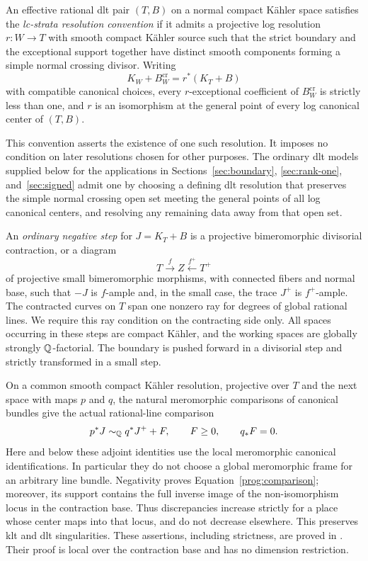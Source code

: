 \begin{definition}
\label{def:lc-strata-resolution}
An effective rational dlt pair \((T,B)\) on a normal compact Kähler space
satisfies the \emph{lc-strata resolution convention} if it admits a
projective log resolution \(r:W\to T\) with smooth compact Kähler source
such that the strict boundary and the exceptional support together have
distinct smooth components forming a simple normal crossing divisor.
Writing
\[
 K_W+B_W^{\mathrm{cr}}=r^*(K_T+B)
\]
with compatible canonical choices, every \(r\)-exceptional coefficient
of \(B_W^{\mathrm{cr}}\) is strictly less than one, and \(r\) is an
isomorphism at the general point of every log canonical center of
\((T,B)\).
\end{definition}

This convention asserts the existence of one such resolution. It imposes
no condition on later resolutions chosen for other purposes. The ordinary
dlt models supplied below for the applications in
Sections~\ref{sec:boundary}, \ref{sec:rank-one}, and~\ref{sec:signed} admit
one by choosing a defining dlt resolution that preserves the simple normal
crossing open set meeting the general points of all log canonical centers,
and resolving any remaining data away from that open set.

An \emph{ordinary negative step} for \(J=K_T+B\) is a projective
bimeromorphic divisorial contraction, or a diagram
\[
 T\xrightarrow{f} Z\xleftarrow{f^+}T^+
\]
of projective small bimeromorphic morphisms, with connected fibers and
normal base, such that \(-J\) is \(f\)-ample and, in the small case,
the trace \(J^+\) is \(f^+\)-ample.  The contracted curves on \(T\)
span one nonzero ray for degrees of global rational lines.  We require
this ray condition on the contracting side only.  All spaces occurring
in these steps are compact Kähler, and the working spaces are globally
strongly \(\mathbb Q\)-factorial.  The boundary is pushed forward in a
divisorial step and strictly transformed in a small step.

On a common smooth compact Kähler resolution, projective over \(T\)
and the next space with maps \(p\) and \(q\), the natural meromorphic comparisons of
canonical bundles give the actual rational-line comparison
\begin{equation}
 p^*J\sim_{\mathbb Q}q^*J^+ +F,\qquad F\geq0,\qquad q_*F=0.
 \label{prog:comparison}
\end{equation}
Here and below these adjoint identities use the local meromorphic
canonical identifications.  In particular they do not choose a global
meromorphic frame for an arbitrary line bundle.  Negativity proves
Equation~\eqref{prog:comparison}; moreover, its support contains the full
inverse image of the non-isomorphism locus in the contraction base.
Thus discrepancies increase strictly for a place whose center maps
into that locus, and do not decrease elsewhere.  This preserves klt
and dlt singularities.  These assertions, including strictness, are
proved in \cite[Lemma~7.3]{CB}.  Their proof is local over the
contraction base and has no dimension restriction.

